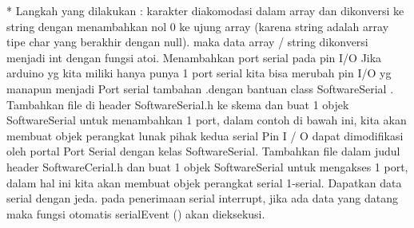 * Langkah yang dilakukan :
karakter diakomodasi dalam array dan dikonversi ke string dengan menambahkan nol 0 ke ujung array (karena string adalah array tipe char yang berakhir dengan null). maka data array / string dikonversi menjadi int dengan fungsi atoi.
Menambahkan port serial pada pin I/O
Jika arduino yg kita miliki hanya punya 1 port serial kita bisa merubah pin I/O yg manapun menjadi Port serial tambahan .dengan bantuan class SoftwareSerial  .  Tambahkan file di header SoftwareSerial.h ke skema dan buat 1 objek SoftwareSerial untuk menambahkan 1 port, dalam contoh di bawah ini, kita akan membuat objek perangkat lunak pihak kedua serial
Pin I / O dapat dimodifikasi oleh portal Port Serial dengan kelas SoftwareSerial. Tambahkan file dalam judul header SoftwareCerial.h dan buat 1 objek SoftwareSerial untuk mengakses 1 port, dalam hal ini kita akan membuat objek perangkat serial 1-serial.
Dapatkan data serial dengan jeda.
pada penerimaan serial interrupt, jika ada data yang datang maka fungsi otomatis serialEvent () akan dieksekusi.\cite{rajamohan2013deaf}